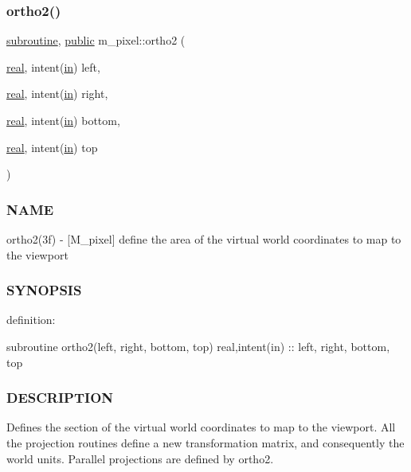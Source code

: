 \subsubsection{\texorpdfstring{ortho2()}{ortho2()}}
{\footnotesize\ttfamily \hyperlink{M__stopwatch_83_8txt_acfbcff50169d691ff02d4a123ed70482}{subroutine}, \hyperlink{M__stopwatch_83_8txt_a2f74811300c361e53b430611a7d1769f}{public} m\+\_\+pixel\+::ortho2 (\begin{DoxyParamCaption}\item[{\hyperlink{read__watch_83_8txt_abdb62bde002f38ef75f810d3a905a823}{real}, intent(\hyperlink{M__journal_83_8txt_afce72651d1eed785a2132bee863b2f38}{in})}]{left,  }\item[{\hyperlink{read__watch_83_8txt_abdb62bde002f38ef75f810d3a905a823}{real}, intent(\hyperlink{M__journal_83_8txt_afce72651d1eed785a2132bee863b2f38}{in})}]{right,  }\item[{\hyperlink{read__watch_83_8txt_abdb62bde002f38ef75f810d3a905a823}{real}, intent(\hyperlink{M__journal_83_8txt_afce72651d1eed785a2132bee863b2f38}{in})}]{bottom,  }\item[{\hyperlink{read__watch_83_8txt_abdb62bde002f38ef75f810d3a905a823}{real}, intent(\hyperlink{M__journal_83_8txt_afce72651d1eed785a2132bee863b2f38}{in})}]{top }\end{DoxyParamCaption})}



\subsubsection*{N\+A\+ME}

ortho2(3f) -\/ \mbox{[}M\+\_\+pixel\mbox{]} define the area of the virtual world coordinates to map to the viewport 

\subsubsection*{S\+Y\+N\+O\+P\+S\+IS}

definition\+:

subroutine ortho2(left, right, bottom, top) real,intent(in) \+:\+: left, right, bottom, top

\subsubsection*{D\+E\+S\+C\+R\+I\+P\+T\+I\+ON}

Defines the section of the virtual world coordinates to map to the viewport. All the projection routines define a new transformation matrix, and consequently the world units. Parallel projections are defined by ortho2.

